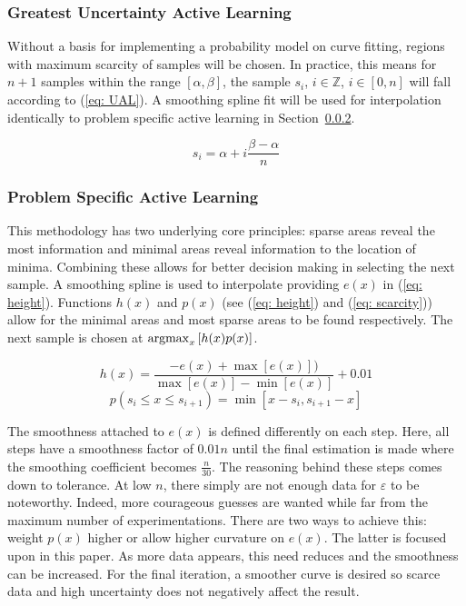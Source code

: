 \subsubsection{Greatest Uncertainty Active Learning}
Without a basis for implementing a probability model on curve fitting, regions with maximum scarcity of samples will be chosen. In practice, this means for $n+1$ samples within the range $[\alpha, \beta]$, the sample $s_i$, $i\in\mathbb{Z}$, $i\in[0, n]$ will fall according to (\ref{eq: UAL}). A smoothing spline fit will be used for interpolation identically to problem specific active learning in Section~\ref{sssec:Active Learning}.

\begin{equation}
  \label{eq: UAL}
  s_i=\alpha+i\frac{\beta-\alpha}{n}
\end{equation}

\subsubsection{Problem Specific Active Learning}
\label{sssec:Active Learning}
This methodology has two underlying core principles: sparse areas reveal the most information and minimal areas reveal information to the location of minima. Combining these allows for better decision making in selecting the next sample. A smoothing spline is used to interpolate providing $e(x)$ in (\ref{eq: height}). Functions $h(x)$ and $p(x)$ (see (\ref{eq: height}) and (\ref{eq: scarcity})) allow for the minimal areas and most sparse areas to be found respectively. The next sample is chosen at ${\operatorname*{argmax}_x{[h(x)p(x)]}}$.

\begin{equation}
  \label{eq: height}
  {h(x)=\frac{-e(x)+\max[e(x)])}{\max[e(x)]-\min[e(x)]}}+0.01
\end{equation}
\begin{equation}
  \label{eq: scarcity}
  p(s_i \le x \le s_{i+1})=\min[x-s_i, s_{i+1}-x]
\end{equation}

The smoothness attached to $e(x)$ is defined differently on each step. Here, all steps have a smoothness factor of $0.01n$ until the final estimation is made where the smoothing coefficient becomes $\frac{n}{30}$. The reasoning behind these steps comes down to tolerance. At low $n$, there simply are not enough data for $\varepsilon$ to be noteworthy. Indeed, more courageous guesses are wanted while far from the maximum number of experimentations. There are two ways to achieve this: weight $p(x)$ higher or allow higher curvature on $e(x)$. The latter is focused upon in this paper. As more data appears, this need reduces and the smoothness can be increased. For the final iteration, a smoother curve is desired so scarce data and high uncertainty does not negatively affect the result.

